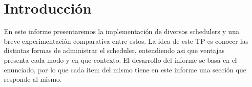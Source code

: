 \section{Introducci\'on}

En este informe presentaremos la implementaci\'on de diversos schedulers y una breve experimentaci\'on comparativa entre estos. 
La idea de este TP es conocer las distintas formas de administrar el scheduler, entendiendo asi que ventajas presenta cada modo y en que contexto.
El desarrollo del informe se basa en el enunciado, por lo que cada item del mismo tiene en este informe una secci\'on que responde al mismo.


